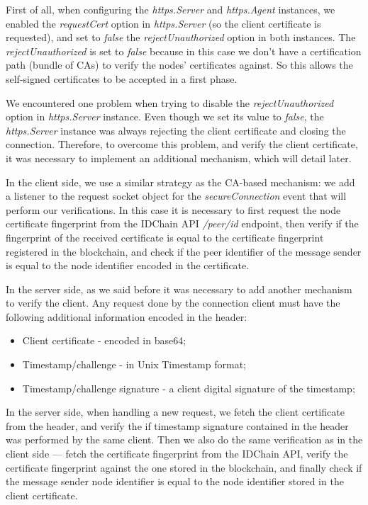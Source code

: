 First of all, when configuring the \textit{https.Server} and \textit{https.Agent} instances, we enabled the \textit{requestCert} option in \textit{https.Server} (so the client certificate is requested), and set to \textit{false} the \textit{rejectUnauthorized} option in both instances.
The \textit{rejectUnauthorized} is set to \textit{false} because in this case we don't have a certification path (bundle of CAs) to verify the nodes' certificates against.
So this allows the self-signed certificates to be accepted in a first phase.

We encountered one problem when trying to disable the \textit{rejectUnauthorized} option in \textit{https.Server} instance.
Even though we set its value to \textit{false}, the \textit{https.Server} instance was always rejecting the client certificate and closing the connection.
Therefore, to overcome this problem, and verify the client certificate, it was necessary to implement an additional mechanism, which will detail later.

In the client side, we use a similar strategy as the CA-based mechanism: we add a listener to the request socket object for the \textit{secureConnection} event that will perform our verifications.
In this case it is necessary to first request the node certificate fingerprint from the IDChain API \textit{/peer/id} endpoint, then verify if the fingerprint of the received certificate is equal to the certificate fingerprint registered in the blockchain, and check if the peer identifier of the message sender is equal to the node identifier encoded in the certificate.

In the server side, as we said before it was necessary to add another mechanism to verify the client.
Any request done by the connection client must have the following additional information encoded in the header:

\begin{itemize}
  \item Client certificate - encoded in base64;
  \item Timestamp/challenge - in Unix Timestamp format;
  \item Timestamp/challenge signature - a client digital signature of the timestamp;
\end{itemize}

In the server side, when handling a new request, we fetch the client certificate from the header, and verify the if timestamp signature contained in the header was performed by the same client.
Then we also do the same verification as in the client side — fetch the certificate fingerprint from the IDChain API, verify the certificate fingerprint against the one stored in the blockchain, and finally check if the message sender node identifier is equal to the node identifier stored in the client certificate.

